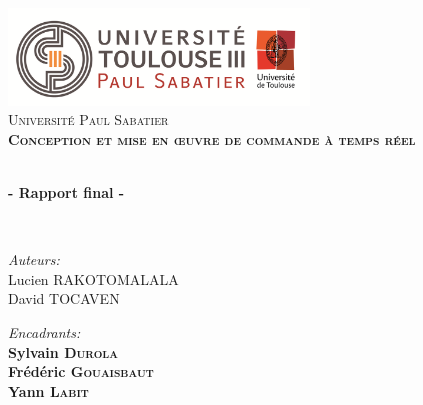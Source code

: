 
\begin{titlepage}
\begin{center}


\includegraphics[width=0.60\textwidth]{./page_de_garde/logo_ups.png}~\\[1cm]

\textsc{\LARGE Université Paul Sabatier}\\[1.5cm]

\textsc{\Large \bf Conception et mise en \oe uvre de commande à temps réel\\[0.5cm]}

\HRule \\[0.4cm]

{\huge \bfseries  - Rapport final -}

\HRule \\[1.5cm]

\begin{minipage}{0.4\textwidth}
\begin{flushleft} \large
\emph{Auteurs:}\\
Lucien \textsc{RAKOTOMALALA}\\
David \textsc{TOCAVEN}\\
\end{flushleft}
\end{minipage}
\begin{minipage}{0.58\textwidth}
\begin{flushright} \large
\emph{Encadrants:} \\
\textbf{ Sylvain \textsc{Durola}}\\
\textbf{ Frédéric \textsc{Gouaisbaut}}\\
\textbf{ Yann \textsc{Labit}}
\end{flushright}
\end{minipage}
\newline
\newline


\end{center}
\end{titlepage}
